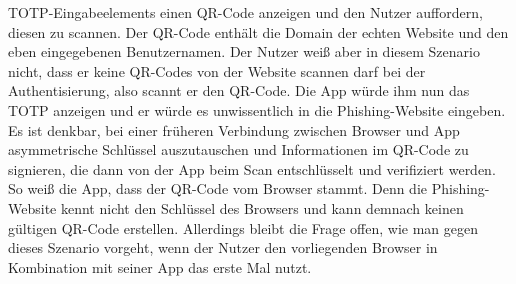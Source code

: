 TOTP-Eingabeelements einen QR-Code anzeigen und den Nutzer auffordern, diesen zu 
scannen. Der QR-Code enthält die Domain der echten Website und den eben eingegebenen 
Benutzernamen. Der Nutzer weiß aber in diesem Szenario nicht, dass er keine QR-Codes 
von der Website scannen darf bei der Authentisierung, also scannt er den QR-Code. Die 
App würde ihm nun das TOTP anzeigen und er würde es unwissentlich in die 
Phishing-Website eingeben. Es ist denkbar, bei einer früheren Verbindung zwischen 
Browser und App asymmetrische Schlüssel auszutauschen und Informationen im QR-Code zu 
signieren, die dann von der App beim Scan entschlüsselt und verifiziert werden. So 
weiß die App, dass der QR-Code vom Browser stammt. Denn die Phishing-Website kennt 
nicht den Schlüssel des Browsers und kann demnach keinen gültigen QR-Code erstellen. 
Allerdings bleibt die Frage offen, wie man gegen dieses Szenario vorgeht, wenn der 
Nutzer den vorliegenden Browser in Kombination mit seiner App das erste Mal nutzt. 